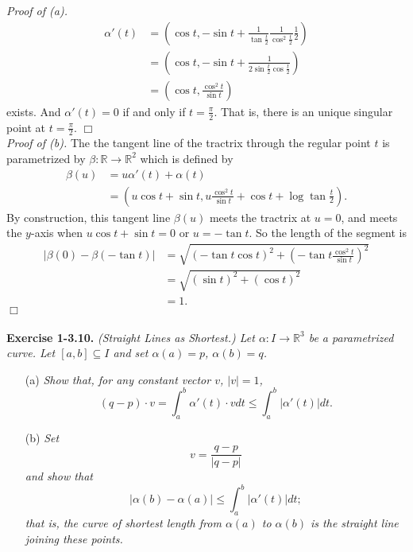 \documentclass{article}
\begin{document}
\emph{Proof of (a).}
\begin{align*}
\alpha'(t)
&= \left(
\cos t,
-\sin t + \frac{1}{\tan\frac{t}{2}} \frac{1}{\cos^{2}\frac{t}{2}} \frac{1}{2}
\right) \\
&= \left(
\cos t,
-\sin t + \frac{1}{2 \sin\frac{t}{2} \cos\frac{t}{2}}
\right) \\
&= \left(
\cos t,
\frac{\cos^2 t}{\sin t}
\right)
\end{align*}
exists.
And $\alpha'(t) = 0$ if and only if $t = \frac{\pi}{2}$.
That is, there is an unique singular point at $t = \frac{\pi}{2}$.
$\Box$ \\

\emph{Proof of (b).}
The the tangent line of the tractrix through the regular point $t$
is parametrized by $\beta: \mathbb{R} \to \mathbb{R}^2$ which is defined by
\begin{align*}
\beta(u)
&= u\alpha'(t) + \alpha(t) \\
&= \left( u \cos t + \sin t, u \frac{\cos^2 t}{\sin t} + \cos t + \log\tan\frac{t}{2} \right).
\end{align*}
By construction, this tangent line $\beta(u)$ meets the tractrix at $u = 0$,
and meets the $y$-axis when $u \cos t + \sin t = 0$ or $u = -\tan t$.
So the length of the segment is
\begin{align*}
|\beta(0) - \beta(-\tan t)|
&= \sqrt{(-\tan t \cos t)^2+ \left( -\tan t \frac{\cos^2 t}{\sin t} \right)^2} \\
&= \sqrt{(\sin t)^2+ (\cos t)^2} \\
&= 1.
\end{align*}
$\Box$ \\\\






\textbf{Exercise 1-3.10.}
\emph{(Straight Lines as Shortest.)
Let $\alpha: I \to \mathbb{R}^3$ be a parametrized curve.
Let $[a,b] \subseteq I$ and set $\alpha(a) = p$, $\alpha(b) = q$.}
\begin{enumerate}
  \item[(a)]
  \emph{Show that, for any constant vector $v$, $|v| = 1$,
  $$(q-p) \cdot v
  = \int_{a}^{b} \alpha'(t) \cdot v dt
  \leq \int_{a}^{b} |\alpha'(t)| dt.$$}
  \item[(b)]
  \emph{Set
  $$v = \frac{q-p}{|q-p|}$$
  and show that
  $$|\alpha(b) - \alpha(a)| \leq \int_{a}^{b} |\alpha'(t)| dt;$$
  that is, the curve of shortest length from
  $\alpha(a)$ to $\alpha(b)$ is the straight line
  joining these points.} \\
\end{enumerate}
\end{document}

